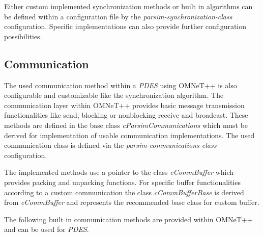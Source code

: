 Either custom implemented synchronization methods or built in algorithms can be defined within a configuration file by the \emph{parsim-synchronization-class} configuration.
Specific implementations can also provide further configuration possibilities. \cite[section 16.3.5]{omnet_manual}

\subsection{Communication}
\label{sec:parallel_omnet_comm}

\begin{sloppypar}
The used communication method within a \emph{PDES} using OMNeT++ is also configurable and customizable like the synchronization algorithm.
The communication layer within OMNeT++ provides basic message transmission functionalities like send, blocking or nonblocking receive and broadcast.
These methods are defined in the base class \emph{cParsimCommunications} which must be derived for implementation of usable communication implementations. 
The used communication class is defined via the \emph{parsim-communications-class} configuration. \cite[section 16.3.5]{omnet_manual}
\end{sloppypar}

The implemented methods use a pointer to the class \emph{cCommBuffer} which provides packing and unpacking functions.
For specific buffer functionalities according to a custom communication the class \emph{cCommBufferBase} is derived from \emph{cCommBuffer} and represents the recommended base class for custom buffer. \cite{omnet_par_api}

\begin{sloppypar}
The following built in communication methods are provided within OMNeT++ and can be used for \emph{PDES}. \cite[section 16.3.5]{omnet_manual} \cite{omnet_par_api}
\end{sloppypar}

